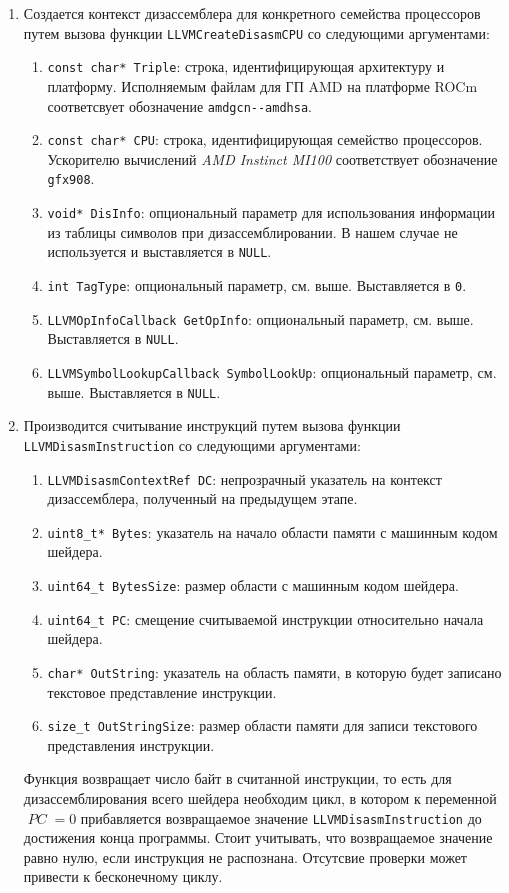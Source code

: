 \documentclass[a4paper,14pt]{extarticle}
\newcommand{\var}[1]{\mathop{\mathit{#1}}}
\newenvironment{ol}{\begin{enumerate}[noitemsep,topsep=0em]}{\end{enumerate}\vspace{20pt}}
\newenvironment{inlineol}{\begin{enumerate}[noitemsep,topsep=0em]}{\end{enumerate}}
\begin{document}
{\begin{ol}
\item Создается контекст дизассемблера для конкретного семейства процессоров
путем вызова функции \verb|LLVMCreateDisasmCPU| со следующими аргументами:
  \begin{inlineol}
  \item \verb|const char* Triple|: строка, идентифицирующая архитектуру и платформу.
Исполняемым файлам для ГП AMD на платформе ROCm соответсвует обозначение \verb|amdgcn--amdhsa|.
  \item \verb|const char* CPU|: строка, идентифицирующая семейство процессоров.
Ускорителю вычислений \textit{AMD Instinct MI100} соответствует обозначение \verb|gfx908|.
  \item \verb|void* DisInfo|: опциональный параметр для использования информации из таблицы
символов при дизассемблировании. В нашем случае не используется и выставляется в \verb|NULL|.
  \item \verb|int TagType|: опциональный параметр, см. выше. Выставляется в \verb|0|.
  \item \verb|LLVMOpInfoCallback GetOpInfo|: опциональный параметр, см. выше. Выставляется в \verb|NULL|.
  \item \verb|LLVMSymbolLookupCallback SymbolLookUp|: опциональный параметр, см. выше. Выставляется в \verb|NULL|. 
  \end{inlineol}

\item Производится считывание инструкций путем вызова функции
\verb|LLVMDisasmInstruction| со следующими аргументами:
  \begin{inlineol}
  \item \verb|LLVMDisasmContextRef DC|: непрозрачный указатель на контекст дизассемблера,
полученный на предыдущем этапе.
  \item \verb|uint8_t* Bytes|: указатель на начало области памяти с машинным кодом шейдера.
  \item \verb|uint64_t BytesSize|: размер области с машинным кодом шейдера.
  \item \verb|uint64_t PC|: смещение считываемой инструкции относительно начала шейдера.
  \item \verb|char* OutString|: указатель на область памяти, в которую будет записано
текстовое представление инструкции.
  \item \verb|size_t OutStringSize|: размер области памяти для записи текстового представления инструкции.
  \end{inlineol}
Функция возвращает число байт в считанной инструкции, то есть для дизассемблирования всего шейдера необходим цикл,
в котором к переменной $\var{PC}=0$ прибавляется возвращаемое значение \verb|LLVMDisasmInstruction| до
достижения конца программы.
Стоит учитывать, что возвращаемое значение равно нулю, если инструкция не распознана. Отсутсвие проверки
может привести к бесконечному циклу.


\end{ol}}
\end{document}
